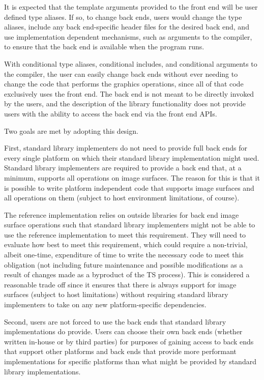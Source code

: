 \pnum
It is expected that the template arguments provided to the front end will be user defined type aliases. If so, to change back ends, users would change the type aliases, include any back end-specific header files for the desired back end, and use implementation dependent mechanisms, such as arguments to the compiler, to ensure that the back end is available when the program runs.

\pnum
With conditional type aliases, conditional includes, and conditional arguments to the compiler, the user can easily change back ends without ever needing to change the code that performs the graphics operations, since all of that code exclusively uses the front end. The back end is not meant to be directly invoked by the users, and the description of the library functionality does not provide users with the ability to access the back end via the front end APIs.

\pnum
Two goals are met by adopting this design.

\pnum
First, standard library implementers do not need to provide full back ends for every single platform on which their standard library implementation might used. Standard library implementers are required to provide a back end that, at a minimum, supports all operations on image surfaces. The reason for this is that it is possible to write platform independent code that supports image surfaces and all operations on them (subject to host environment limitations, of course).

\pnum
The reference implementation relies on outside libraries for back end image surface operations such that standard library implementers might not be able to use the reference implementation to meet this requirement. They will need to evaluate how best to meet this requirement, which could require a non-trivial, albeit one-time, expenditure of time to write the necessary code to meet this obligation (not including future maintenance and possible modifications as a result of changes made as a byproduct of the TS process). This is considered a reasonable trade off since it ensures that there is always support for image surfaces (subject to host limitations) without requiring standard library implementers to take on any new platform-specific dependencies.

\pnum
Second, users are not forced to use the back ends that standard library implementations do provide. Users can choose their own back ends (whether written in-house or by third parties) for purposes of gaining access to back ends that support other platforms and back ends that provide more performant implementations for specific platforms than what might be provided by standard library implementations.

